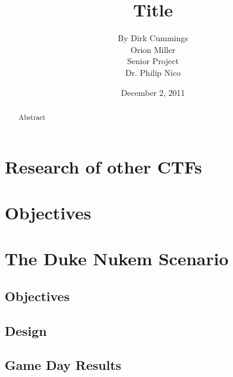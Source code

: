 \documentclass[10pt]{article}
\begin{document}
\title{\vfill Title}
\author{
 By Dirk Cummings \vspace{10pt} \\
 Orion Miller \vspace{10pt} \\ 
Senior Project  \vspace{10pt} \\ 
Dr. Philip Nico \vspace{10pt} \\ 
}
\date{December 2, 2011}

\maketitle

\vfill  %
\begin{abstract}
Abstract
\end{abstract}

\thispagestyle{empty} %

\newpage

\thispagestyle{empty}  %
\tableofcontents

\newpage
\setcounter{page}{1}

\section{Research of other CTFs}

\section{Objectives}

\section{The Duke Nukem Scenario}
\subsection{Objectives}
\subsection{Design}
\subsection{Game Day Results}
\end{document}

